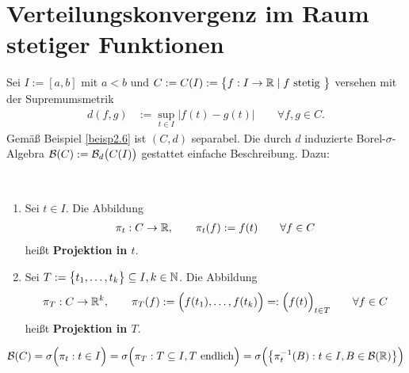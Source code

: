 \section{Verteilungskonvergenz im Raum stetiger Funktionen} %
Sei $I:=[a,b]$ mit $a<b$ und $C:=C(I):=\big\lbrace f:I\to\mathbb{R}\mid f\text{ stetig }\big\rbrace$ versehen mit der Supremumsmetrik
\begin{align*}
	d(f,g)&:=\sup\limits_{t\in I}\big|f(t)-g(t)\big|\qquad\forall f,g\in C.
\end{align*}
Gemäß Beispiel \ref{beisp2.6} ist $(C,d)$ separabel. 
Die durch $d$ induzierte Borel-$\sigma$-Algebra
$\mathcal{B}(C):=\mathcal{B}_d\big(C(I)\big)$
gestattet einfache Beschreibung. 
Dazu:

\begin{definition}\ %
	\begin{enumerate}[label=(\arabic*)]
		\item Sei $t\in I$. Die Abbildung 
		\begin{align*}
			\pi_t:C\to\mathbb{R},\qquad\pi_t(f):=f(t)\qquad\forall f\in C
		\end{align*}
		heißt \textbf{Projektion in $t$}.
		\item Sei $T:=\big\lbrace t_1,\ldots,t_k\big\rbrace\subseteq I,k\in\mathbb{N}$. Die Abbildung
		\begin{align*}
			\pi_T:C\to\mathbb{R}^k,\qquad \pi_T(f):=\Big(f(t_1),\ldots,f(t_k)\Big)=:
			\Big(f(t)\Big)_{t\in T}\qquad\forall f\in C
		\end{align*}
		heißt \textbf{Projektion in $T$}.
	\end{enumerate}
\end{definition}

\begin{satz}\label{satz7.2}
	\begin{align*}
		\mathcal{B}(C)
		=\sigma\Big(\pi_t:t\in I\Big)=\sigma\Big(\pi_T:T\subseteq I,T\text{ endlich}\Big)
		=\sigma\Big(\big\lbrace \pi_t^{-1}(B):t\in I,B\in\mathcal{B}(\mathbb{R})\big\rbrace\Big)
	\end{align*}
\end{satz}

